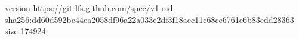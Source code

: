 version https://git-lfs.github.com/spec/v1
oid sha256:dd60d592bc44ea2058df96a22a033e2df3f18aec11c68ce6761e6b83edd28363
size 174924
